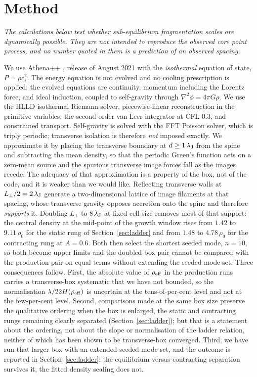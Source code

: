 \documentclass[usenatbib,twoside,twocolumn]{mnras}
\begin{document}
\section{Method}
\label{sec:method}


\smallskip\noindent\emph{The calculations below test whether sub-equilibrium fragmentation scales are dynamically possible. They are not intended to reproduce the observed core point process, and no number quoted in them is a prediction of an observed spacing.}

\smallskip We use Athena++ \citep{Stone2020}, release of August 2021 with the \emph{isothermal} equation of state, $P=\rho c_s^2$. The energy equation is not evolved and no cooling prescription is applied; the evolved equations are continuity, momentum including the Lorentz force, and ideal induction, coupled to self-gravity through $\nabla^2\phi=4\pi G\rho$. We use the HLLD isothermal Riemann solver, piecewise-linear reconstruction in the primitive variables, the second-order van Leer integrator at CFL $0.3$, and constrained transport. Self-gravity is solved with the FFT Poisson solver, which is triply periodic; transverse isolation is therefore \emph{not} imposed exactly. We approximate it by placing the transverse boundary at $d\geq1\,\lambda_{\rm J}$ from the spine and subtracting the mean density, so that the periodic Green's function acts on a zero-mean source and the spurious transverse image forces fall as the images recede. The adequacy of that approximation is a property of the box, not of the code, and it is weaker than we would like. Reflecting transverse walls at $L_\perp/2=2\,\lambda_{\rm J}$ generate a two-dimensional lattice of image filaments at that spacing, whose transverse gravity opposes accretion onto the spine and therefore \emph{supports} it. Doubling $L_\perp$ to $8\,\lambda_{\rm J}$ at fixed cell size removes most of that support: the central density at the mid-point of the growth window rises from $1.42$ to $9.11\,\rho_0$ for the static rung of Section~\ref{sec:ladder} and from $1.48$ to $4.78\,\rho_0$ for the contracting rung at $A=0.6$. Both then select the shortest seeded mode, $n=10$, so both become upper limits and the doubled-box pair cannot be compared with the production pair on equal terms without extending the seeded mode set. Three consequences follow. First, the absolute value of $\rho_{\rm eff}$ in the production runs carries a transverse-box systematic that we have not bounded, so the normalisation $\lambda/22H(\rho_{\rm eff})$ is uncertain at the tens-of-per-cent level and not at the few-per-cent level. Second, comparisons made at the same box size preserve the qualitative ordering when the box is enlarged, the static and contracting rungs remaining clearly separated (Section~\ref{sec:ladder}); but that is a statement about the ordering, not about the slope or normalisation of the ladder relation, neither of which has been shown to be transverse-box converged. Third, we have run that larger box with an extended seeded mode set, and the outcome is reported in Section~\ref{sec:ladder}: the equilibrium-versus-contracting separation survives it, the fitted density scaling does not.
\end{document}
